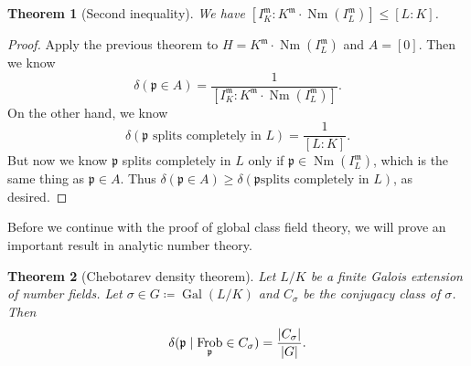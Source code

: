 \documentclass[leqno, openany]{memoir}
\newtheorem{thm}{Theorem}[section]
\theoremstyle{definition}
\theoremstyle{remark}
\theoremstyle{plain}
\theoremstyle{definition}
\theoremstyle{remark}
\newcommand{\mf}[1]{\mathfrak{#1}}
\DeclareMathOperator{\Gal}{Gal}
\DeclareMathOperator{\Nm}{Nm}
\DeclareMathOperator{\Frob}{Frob}
\begin{document}
\begin{thm}[Second inequality] We have $[I_K^{\mf{m}} : K^{\mf{m}} \cdot
\Nm(I_L^{\mf{m}})] \leq [L:K]$.  \end{thm}

\begin{proof} Apply the previous theorem to $H = K^{\mf{m}} \cdot
    \Nm(I_L^{\mf{m}})$ and $A = [0]$. Then we know \[ \delta(\mf{p} \in A) =
        \frac{1}{[I_K^{\mf{m}} : K^{\mf{m}} \cdot \Nm(I_L^{\mf{m}})]}. \] On
        the other hand, we know \[ \delta(\mf{p}\text{ splits completely in }L)
        = \frac{1}{[L:K]}. \] But now we know $\mf{p}$ splits completely in $L$
        only if $\mf{p} \in \Nm(I_L^{\mf{m}})$, which is the same thing as
        $\mf{p} \in A$. Thus $\delta(\mf{p} \in A) \geq \delta(\mf{p}\text{
        splits completely in }L)$, as desired.  \end{proof}

Before we continue with the proof of global class field theory, we will prove
an important result in analytic number theory.

\begin{thm}[Chebotarev density theorem] Let $L/K$ be a finite Galois extension
    of number fields. Let $\sigma \in G \coloneqq \Gal(L/K)$ and $C_{\sigma}$
    be the conjugacy class of $\sigma$. Then \[ \delta(\mf{p} \mid
    \Frob_{\mf{p}} \in C_{\sigma}) = \frac{\abs{C_{\sigma}}}{\abs{G}}. \]
\end{thm}
\end{document}
